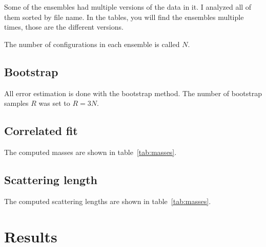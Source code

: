 \documentclass[11pt, english, fleqn, DIV=15, headinclude]{scrartcl}
\begin{document}
Some of the ensembles had multiple versions of the data in it. I analyzed all
of them sorted by file name. In the tables, you will find the ensembles
multiple times, those are the different versions.

The number of configurations in each ensemble is called $N$.


\subsection{Bootstrap}
\label{sec:bootstrap}

All error estimation is done with the bootstrap method. The number of bootstrap
samples $R$ was set to $R = 3N$.

\subsection{Correlated fit}
\label{sec:correlated_fit}

The computed masses are shown in table~\ref{tab:masses}.

\subsection{Scattering length}
\label{sec:scattering_length}

The computed scattering lengths are shown in table~\ref{tab:masses}.

\section{Results}
\label{sec:results}
\end{document}

